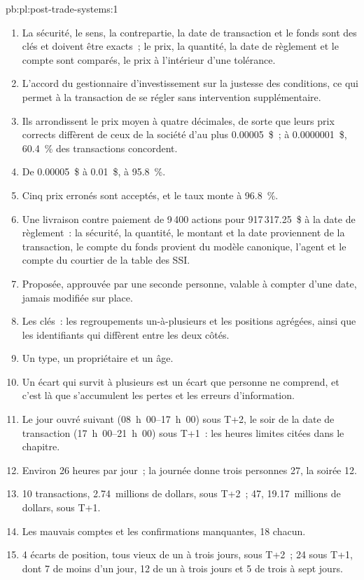 \begin{solution}{pb:pl:post-trade-systems:1}
\begin{enumerate}
\item La sécurité, le sens, la contrepartie, la date de transaction et le fonds sont des clés et doivent être exacts~; le prix, la quantité, la date de règlement et le compte sont comparés,
le prix à l'intérieur d'une tolérance.
\item L'accord du gestionnaire d'investissement sur la justesse des conditions, ce qui permet à la transaction de se régler sans intervention supplémentaire.
\item Ils arrondissent le prix moyen à quatre décimales, de sorte que leurs prix corrects diffèrent de ceux de la société d'au plus 0.00005~\$~; à 0.0000001~\$, 60.4~\%
des transactions concordent.
\item De 0.00005~\$ à 0.01~\$, à 95.8~\%.
\item Cinq prix erronés sont acceptés, et le taux monte à 96.8~\%.
\item Une livraison contre paiement de 9\,400 actions pour 917\,317.25~\$ à la date de règlement~: la sécurité, la quantité, le montant et la date proviennent de la transaction,
le compte du fonds provient du modèle canonique, l'agent et le compte du courtier de la table des SSI.
\item Proposée, approuvée par une seconde personne, valable à compter d'une date, jamais modifiée sur place.
\item Les clés~: les regroupements un-à-plusieurs et les positions agrégées, ainsi que les identifiants qui diffèrent entre les deux côtés.
\item Un type, un propriétaire et un âge.
\item Un écart qui survit à plusieurs  est un écart que personne ne comprend, et c'est là que s'accumulent les pertes et les erreurs d'information.
\item Le jour ouvré suivant (08~h~00--17~h~00) sous T+2, le soir de la date de transaction (17~h~00--21~h~00) sous T+1~: les heures limites citées dans le chapitre.
\item Environ 26 heures par jour~; la journée donne trois personnes 27, la soirée 12.
\item 10 transactions, 2.74~millions de dollars, sous T+2~; 47, 19.17~millions de dollars, sous T+1.
\item Les mauvais comptes et les confirmations manquantes, 18 chacun.
\item 4 écarts de position, tous vieux de un à trois jours, sous T+2~; 24 sous T+1, dont 7 de moins d'un jour, 12 de un à trois jours et 5 de trois à sept jours.

\end{enumerate}
\end{solution}
